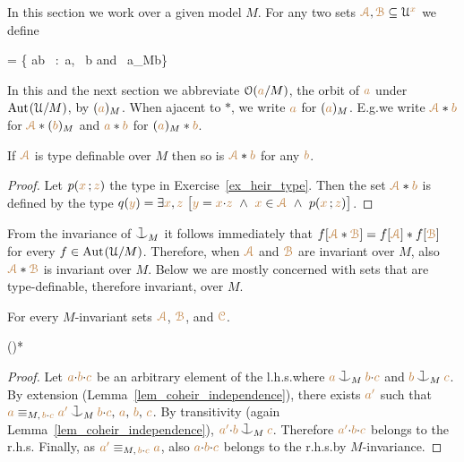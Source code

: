 In this section we work over a given model $M$.
For any two sets ${\color{brown}\EuScript A},{\color{brown}\EuScript B}\subseteq\EuScript U^{\color{brown} x}$ we define

\ceq{\hfill\emph{$\mrA*\mrB$}}
{=}
{\Big\{ {\mr a}{\cdot}{\mr b}
\ :\ 
{\mr a}\in\mrA, \ {\mr b}\in\mrB\textrm{ and }\ {\mr a}\cnonfork_M{\mr b}\Big\}}

In this and the next section we abbreviate $\EuScript O({\color{brown} a}/M)$, 
the orbit of ${\color{brown} a}$ under ${\rm Aut\kern.15ex}(\EuScript U/M)$, 
by \emph{$({\color{brown} a})_M$}.
When ajacent to $*$, we write ${\color{brown} a}$ for $({\color{brown} a})_M$.
E.g.\@ we write \emph{${\color{brown}\EuScript A}*{\color{brown} b}$} for ${\color{brown}\EuScript A}*({\color{brown} b})_M$ and \emph{${\color{brown} a}*{\color{brown} b}$} for $({\color{brown} a})_M*{\color{brown} b}$.

\begin{proposition}\label{prop_typedef_Ab}
If ${\color{brown}\EuScript A}$ is type definable over $M$ then so is ${\color{brown}\EuScript A}*{\color{brown} b}$ 
for any ${\color{brown} b}$.
\end{proposition}
\begin{proof}
  Let $p({\color{brown} x}\,;{\color{brown} z})$ the type in Exercise~\ref{ex_heir_type}.
  Then the set ${\color{brown}\EuScript A}*{\color{brown} b}$ is defined by the type $q({\color{brown} y})=\exists {\color{brown}x},{\color{brown} z}\ \big[ {\color{brown} y}={\color{brown} x}{\cdot}{\color{brown} z}\ \wedge\ {\color{brown} x}\in{\color{brown}\EuScript A} \ \wedge\ p({\color{brown} x}\,;{\color{brown} z})\big]$.
\end{proof}

From the invariance of $\cnonfork_M$ it follows immediately that $f[{\color{brown}\EuScript A}*{\color{brown}\EuScript B}]=f[{\color{brown}\EuScript A}]*f[{\color{brown}\EuScript B}]$ for every $f\in{\rm Aut\kern.15ex}(\EuScript U/M)$.
%
Therefore, when ${\color{brown}\EuScript A}$ and ${\color{brown}\EuScript B}$ are invariant over $M$,
also $\mrA*\mrB$ is invariant over $M$.
Below we are mostly concerned with sets that are type-definable, therefore invariant, over $M$.

\begin{proposition}\label{prop_semi_associative}
For every $M$-invariant sets ${\color{brown}\EuScript A}$, ${\color{brown}\EuScript B}$, and ${\color{brown}\EuScript C}$.

\ceq{\hfill\mrA*\big(\mrB*\mrC\big)}
{\subseteq}
{\big(\mrA*\mrB\big)*\mrC}
\end{proposition}
\begin{proof}
Let ${\color{brown} a}{\cdot}{\color{brown} b}{\cdot}{\color{brown} c}$ be an arbitrary element of the l.h.s.\@ where ${\mr a}\cnonfork_M{\mr b}{\cdot}{\mr c}$ and ${\mr b}\cnonfork_M{\mr c}$.
By extension (Lemma~\ref{lem_coheir_independence}),
there exists ${\color{brown} a'}$ such that 
${\mr a}\equiv_{M,\,{\mr b}{\cdot}{\mr c}}{\mr a'}\cnonfork_M{\mr b}{\cdot}{\mr c},\,{\mr a},\,{\mr b},\,{\mr c}$.
By transitivity (again Lemma~\ref{lem_coheir_independence}),
${\mr a'}{\cdot}{\mr b}\cnonfork_M{\mr c}$.
Therefore ${\color{brown} a'}{\cdot}{\color{brown} b}{\cdot}{\color{brown} c}$ belongs to the r.h.s.
Finally, as ${\color{brown} a'}\equiv_{M,\,{\color{brown} b}{\cdot}{\color{brown} c}}{\color{brown} a}$,
also ${\color{brown} a}{\cdot}{\color{brown} b}{\cdot}{\color{brown} c}$ belongs to the r.h.s.\@ by $M$-invariance.
\end{proof}

